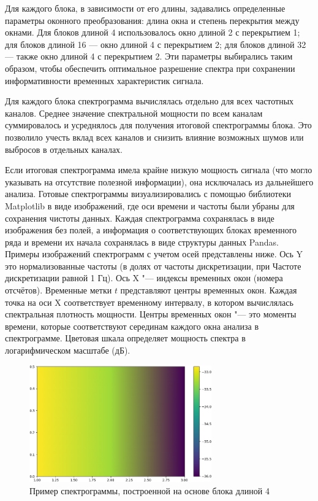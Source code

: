 \documentclass[spec, och, diploma]{SCWorks}
\begin{document}
        Для каждого блока, в зависимости от его длины, задавались определенные
        параметры оконного преобразования: длина окна и степень перекрытия между
        окнами. Для блоков длиной 4 использовалось окно длиной 2 с перекрытием
        1; для блоков длиной 16 — окно длиной 4 с перекрытием 2; для блоков
        длиной 32 — также окно длиной 4 с перекрытием 2. Эти параметры
        выбирались таким образом, чтобы обеспечить оптимальное разрешение
        спектра при сохранении информативности временных характеристик сигнала.

        Для каждого блока спектрограмма вычислялась отдельно для всех частотных
        каналов. Среднее значение спектральной мощности по всем каналам
        суммировалось и усреднялось для получения итоговой спектрограммы блока.
        Это позволило учесть вклад всех каналов и снизить влияние возможных
        шумов или выбросов в отдельных каналах. 

        Если итоговая спектрограмма имела крайне низкую мощность сигнала (что
        могло указывать на отсутствие полезной информации), она исключалась из
        дальнейшего анализа. Готовые спектрограммы визуализировались с помощью
        библиотеки Matplotlib в виде изображений, где оси времени и частоты были
        убраны для сохранения чистоты данных. Каждая спектрограмма сохранялась в
        виде изображения без полей, а информация о соответствующих блоках
        временного ряда и времени их начала сохранялась в виде структуры данных
        Pandas. Примеры изображений спектрограмм с учетом осей представлены
        ниже. Ось Y это нормализованные частоты (в долях от частоты
        дискретизации, при Частоте дискретизации равной 1 Гц). Ось X "---
        индексы временных окон (номера отсчётов). Временные метки $t$
        представляют центры временных окон. Каждая точка на оси X соответствует
        временному интервалу, в котором вычислялась спектральная плотность
        мощности. Центры временных окон "--- это моменты времени, которые
        соответствуют серединам каждого окна анализа в спектрограмме. Цветовая
        шкала определяет мощность спектра в логарифмическом масштабе (дБ).

        \begin{figure}[H]
            \centering
            \includegraphics[width=0.7\textwidth]{pic/spect4.png}
            \caption{Пример спектрограммы, построенной на основе блока длиной 4}
        \end{figure}
\end{document}
